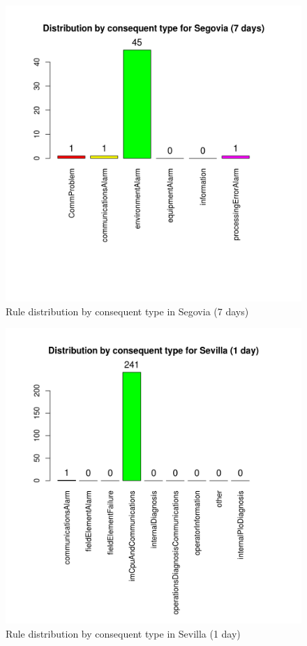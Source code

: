 \begin{figure}[hbtp]
\includegraphics[width=\textwidth]{img/conseqtypes_seg7.png}
\caption{Rule distribution by consequent type in Segovia (7 days)} \label{fig:conseqtypes_seg7}
\end{figure}

\begin{figure}[hbtp]
\includegraphics[width=\textwidth]{img/conseqtypes_sev1.png}
\caption{Rule distribution by consequent type in Sevilla (1 day)} \label{fig:conseqtypes_sev1}
\end{figure}


